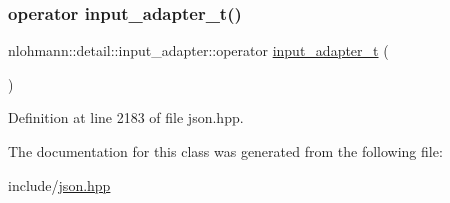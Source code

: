 \subsubsection{\texorpdfstring{operator input\+\_\+adapter\+\_\+t()}{operator input\_adapter\_t()}}
{\footnotesize\ttfamily nlohmann\+::detail\+::input\+\_\+adapter\+::operator \hyperlink{namespacenlohmann_1_1detail_ae132f8cd5bb24c5e9b40ad0eafedf1c2}{input\+\_\+adapter\+\_\+t} (\begin{DoxyParamCaption}{ }\end{DoxyParamCaption})\hspace{0.3cm}{\ttfamily [inline]}}



Definition at line 2183 of file json.\+hpp.



The documentation for this class was generated from the following file\+:\begin{DoxyCompactItemize}
\item 
include/\hyperlink{json_8hpp}{json.\+hpp}\end{DoxyCompactItemize}
